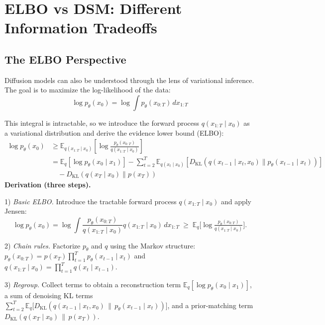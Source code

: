 \section{ELBO vs DSM: Different Information Tradeoffs}
\label{sec:elbo_vs_dsm}

\vspBlock

\subsection{The ELBO Perspective}

Diffusion models can also be understood through the lens of variational inference. The goal is to maximize the log-likelihood of the data:
%
\begin{equation}
\log p_\theta(x_0) = \log \int p_\theta(x_{0:T}) \, dx_{1:T}
\end{equation}

\vspPara

This integral is intractable, so we introduce the forward process $q(x_{1:T} \mid x_0)$ as a variational distribution and derive the evidence lower bound (ELBO):
%
\begin{align}
\log p_\theta(x_0) &\geq \mathbb{E}_{q(x_{1:T} \mid x_0)} \left[ \log \frac{p_\theta(x_{0:T})}{q(x_{1:T} \mid x_0)} \right] \\
&= \mathbb{E}_q \left[ \log p_\theta(x_0 \mid x_1) \right] - \sum_{t=2}^T \mathbb{E}_{q(x_t\mid x_0)} \left[ D_{\text{KL}}(q(x_{t-1} \mid x_t, x_0) \| p_\theta(x_{t-1} \mid x_t)) \right] \\
&\quad - D_{\text{KL}}(q(x_T \mid x_0) \| p(x_T))
\end{align}
\vspPara
\textbf{Derivation (three steps).}

1) \emph{Basic ELBO.} Introduce the tractable forward process $q(x_{1:T}\mid x_0)$ and apply Jensen:
$$\log p_\theta(x_0) = \log \int \frac{p_\theta(x_{0:T})}{q(x_{1:T}\mid x_0)} q(x_{1:T}\mid x_0)\,dx_{1:T} \;\ge\; \mathbb{E}_q\Big[\log \tfrac{p_\theta(x_{0:T})}{q(x_{1:T}\mid x_0)}\Big].$$

2) \emph{Chain rules.} Factorize $p_\theta$ and $q$ using the Markov structure: $p_\theta(x_{0:T})=p(x_T)\prod_{t=1}^T p_\theta(x_{t-1}\mid x_t)$ and $q(x_{1:T}\mid x_0)=\prod_{t=1}^T q(x_t\mid x_{t-1})$.

3) \emph{Regroup.} Collect terms to obtain a reconstruction term $\mathbb{E}_q[\log p_\theta(x_0\mid x_1)]$, a sum of denoising KL terms $\sum_{t=2}^T \mathbb{E}_q\big[ D_{\mathrm{KL}}(q(x_{t-1}\mid x_t,x_0)\,\|\,p_\theta(x_{t-1}\mid x_t))\big]$, and a prior-matching term $D_{\mathrm{KL}}(q(x_T\mid x_0)\,\|\,p(x_T))$.

